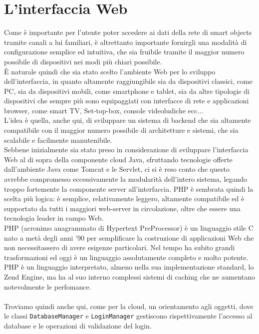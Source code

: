 \section{L'interfaccia Web}
Come è importante per l'utente poter accedere ai dati della rete di smart objects tramite canali a lui familiari, è altrettanto importante fornirgli una modalità di configurazione semplice ed intuitiva, che sia fruibile tramite il maggior numero possibile di dispositivi nei modi più chiari possibile.
\\È naturale quindi che sia stato scelto l'ambiente Web per lo sviluppo dell'interfaccia, in quanto altamente raggiungibile sia da dispositivi classici, come PC, sia da dispositivi mobili, come smartphone e tablet, sia da altre tipologie di dispositivi che sempre più sono equipaggiati con interfacce di rete e applicazioni browser, come smart TV, Set-top-box, console videoludiche ecc...
\\L'idea è quella, anche qui, di sviluppare un sistema di backend che sia altamente compatibile con il maggior numero possibile di architetture e sistemi, che sia scalabile e facilmente manutenibile.
\\Sebbene inizialmente sia stato preso in considerazione di sviluppare l'interfaccia Web al di sopra della componente cloud Java, sfruttando tecnologie offerte dall'ambiente Java come Tomcat e le Servlet, ci si è reso conto che questo avrebbe compromesso eccessivamente la modularità dell'intero sistema, legando troppo fortemente la componente server all'interfaccia. PHP è sembrata quindi la scelta più logica: è semplice, relativamente leggero, altamente compatibile ed è supportato da tutti i maggiori web-server in circolazione, oltre che essere una tecnologia leader in campo Web.
\\PHP (acronimo anagrammato di Hypertext PreProcessor) è un linguaggio stile C nato a metà degli anni '90 per semplificare la costruzione di applicazioni Web che non necessitassero di avere esigenze particolari. Nel tempo ha subito grandi trasformazioni ed oggi è un linguaggio assolutamente completo e molto potente. PHP è un linguaggio interpretato, almeno nella sua implementazione standard, lo Zend Engine, ma ha al suo interno complessi sistemi di caching che ne aumentano notevolmente le perfomance.
\\\\Troviamo quindi anche qui, come per la cloud, un orientamento agli oggetti, dove le classi {\tt DatabaseManager} e {\tt LoginManager} gestiscono rispettivamente l'accesso al database e le operazioni di validazione del login.
